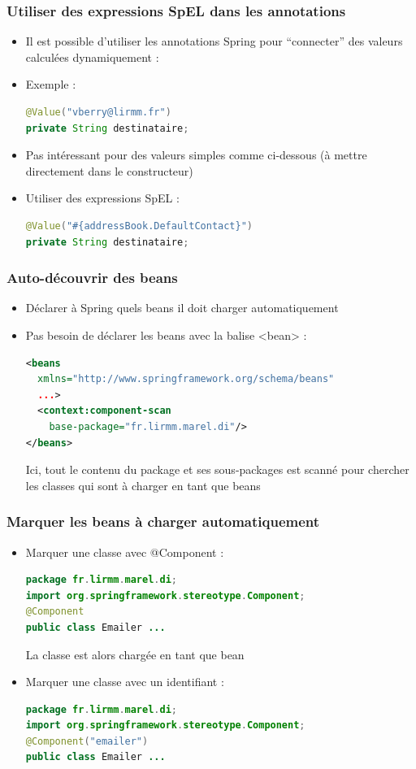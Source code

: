 \documentclass{beamer}
\begin{document}
\begin{frame}[fragile]
  \frametitle{Utiliser des expressions SpEL dans les annotations}
  \begin{itemize}
\item Il est possible d'utiliser les annotations Spring pour ``connecter''
des valeurs calculées dynamiquement :
\item Exemple :
\begin{lstlisting}[language=Java,basicstyle=\scriptsize]        
@Value("vberry@lirmm.fr")
private String destinataire;
\end{lstlisting}
\item Pas intéressant pour des valeurs simples comme ci-dessous
(à mettre directement dans le constructeur)
\item Utiliser des expressions SpEL :
\begin{lstlisting}[language=Java,basicstyle=\scriptsize]          
@Value("#{addressBook.DefaultContact}")
private String destinataire;
\end{lstlisting}
\end{itemize}
\end{frame}

\begin{frame}[fragile]
  \frametitle{Auto-découvrir des beans}
  \begin{itemize}
\item Déclarer à Spring quels beans il doit charger automatiquement
\item Pas besoin de déclarer les beans avec la balise <bean> :
\begin{lstlisting}[language=XML,basicstyle=\scriptsize]          
<beans
  xmlns="http://www.springframework.org/schema/beans"
  ...>
  <context:component-scan
    base-package="fr.lirmm.marel.di"/>
</beans>
\end{lstlisting}
Ici, tout le contenu du package et ses sous-packages est scanné
pour chercher les classes qui sont à charger en tant que beans
\end{itemize}
\end{frame}

\begin{frame}[fragile]
  \frametitle{Marquer les beans à charger automatiquement}
  \begin{itemize}
\item Marquer une classe avec @Component :
\begin{lstlisting}[language=Java,basicstyle=\scriptsize]          
package fr.lirmm.marel.di;
import org.springframework.stereotype.Component;
@Component
public class Emailer ...
\end{lstlisting}
La classe est alors chargée en tant que bean
\item Marquer une classe avec un identifiant :
\begin{lstlisting}[language=Java,basicstyle=\scriptsize]            
package fr.lirmm.marel.di;
import org.springframework.stereotype.Component;
@Component("emailer")
public class Emailer ...
\end{lstlisting}
\end{itemize}
\end{frame}
\end{document}
